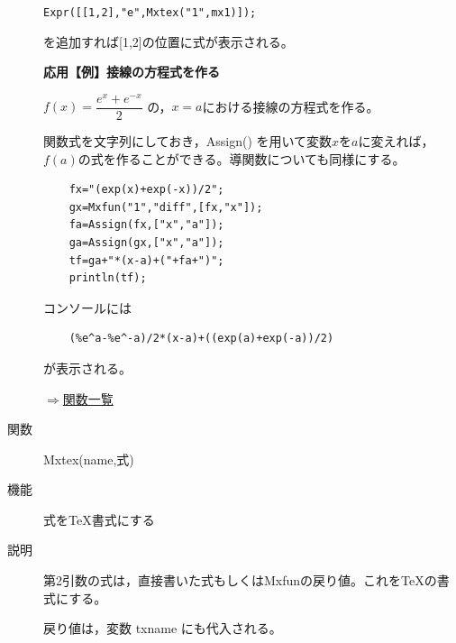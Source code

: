 \documentclass[papersize,a4paper,12pt,uplatex]{jsarticle}
\begin{document}
\begin{description}
    \verb|Expr([[1,2],"e",Mxtex("1",mx1)]);|
    
を追加すれば[1,2]の位置に式が表示される。

\vspace{\baselineskip}
{\bf 応用【例】接線の方程式を作る}

\vspace{\baselineskip}
  $f(x)=\dfrac{e^x+e^{-x}}{2}$ の，$x=a$における接線の方程式を作る。
  
  関数式を文字列にしておき，Assign() を用いて変数$x$を$a$に変えれば，$f(a)$の式を作ることができる。導関数についても同様にする。
  
\begin{verbatim}
    fx="(exp(x)+exp(-x))/2";
    gx=Mxfun("1","diff",[fx,"x"]);
    fa=Assign(fx,["x","a"]);
    ga=Assign(gx,["x","a"]);
    tf=ga+"*(x-a)+("+fa+")";
    println(tf);
\end{verbatim}
  コンソールには
\begin{verbatim}
    (%e^a-%e^-a)/2*(x-a)+((exp(a)+exp(-a))/2) 
\end{verbatim}
が表示される。

\begin{flushright}  \hyperlink{functionlist}{$\Rightarrow$関数一覧}\end{flushright}
\vspace{\baselineskip}
\hypertarget{mxtex}{}
\item[関数]  Mxtex(name,式)
\item[機能]  式をTeX書式にする
\item[説明]  第2引数の式は，直接書いた式もしくはMxfunの戻り値。これをTeXの書式にする。

戻り値は，変数 txname にも代入される。


\end{description}
\end{document}

